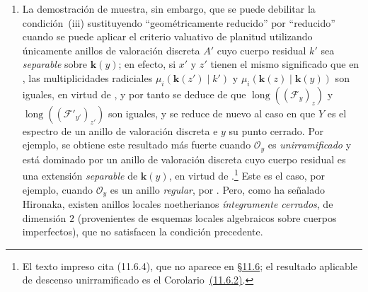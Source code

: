 \begin{remarks}[15.2.4]
\begin{enumerate}[label=(\roman*)]
Para construir los anillos $A$ y $A'$, partamos de un cuerpo imperfecto $k$ de característica $p>0$; sea $K_0=k((T))$ el cuerpo de las series formales sobre $k$, $A_0$ el anillo de valoración para $K_0$ correspondiente a la valoración discreta igual al \emph{orden} de las series formales; el cuerpo residual de $A_0$ es, pues, $k$.
Sea $\alpha$ un elemento de $k$ que no es una potencia $p$-ésima, y tomemos $k'=k(\alpha^{1/p})$; $K=k'((T))$ es entonces una extensión radicial finita de $K_0$, y $A'=A_0\otimes_k k'$ es el anillo de valoración discreta para $K$ correspondiente al orden de las series formales sobre $K$.
Si $\mathfrak m'$ es el ideal maximal de $A'$, las condiciones 1) y 2) se satisfacen tomando $A=A_0+\mathfrak m'$: en efecto, como $A_0$ es noetheriano y $A'$ es un $A_0$-módulo de tipo finito, $A$ es una $A_0$-álgebra finita, y por tanto un anillo noetheriano; como $A'$ es finito sobre $A$, $\mathfrak m'$ es el único ideal maximal de $A$, que es así un anillo local completo, evidentemente de dimensión $1$ (por ser finito sobre $A_0$) y geométricamente unirramificado, puesto que $A'$ es íntegramente cerrado y tiene el mismo cuerpo de fracciones $K$ que $A$.
  \item La demostración de  muestra, sin embargo, que se puede debilitar la condición~(iii) sustituyendo ``geométricamente reducido'' por ``reducido'' cuando se puede aplicar el criterio valuativo de planitud  utilizando únicamente anillos de valoración discreta $A'$ cuyo cuerpo residual $k'$ sea \emph{separable} sobre $\boldsymbol{k}(y)$; en efecto, si $x'$ y $z'$ tienen el mismo significado que en , las multiplicidades radiciales $\mu_i(\boldsymbol{k}(z')\mid k')$ y $\mu_i(\boldsymbol{k}(z)\mid\boldsymbol{k}(y))$ son iguales, en virtud de , y por tanto se deduce de  que $\operatorname{long}((\mathcal F_y)_z)$ y $\operatorname{long}((\mathcal F'_{y'})_{z'})$ son iguales, y se reduce de nuevo al caso en que $Y$ es el espectro de un anillo de valoración discreta e $y$ su punto cerrado.
Por ejemplo, se obtiene este resultado más fuerte cuando $\mathcal O_y$ es \emph{unirramificado} y está dominado por un anillo de valoración discreta cuyo cuerpo residual es una extensión \emph{separable} de $\boldsymbol{k}(y)$, en virtud de .\footnote{El texto impreso cita (11.6.4), que no aparece en {\hyperlink{ega4.c04.subsec.11-6}{\S11.6}}; el resultado aplicable de descenso unirramificado es el Corolario~{\hyperlink{ega4.c04.cor.11-6-2}{(11.6.2)}}.}
Este es el caso, por ejemplo, cuando $\mathcal O_y$ es un anillo \emph{regular}, por .
Pero, como ha señalado Hironaka, existen anillos locales noetherianos \emph{íntegramente cerrados}, de dimensión $2$ (provenientes de esquemas locales algebraicos sobre cuerpos imperfectos), que no satisfacen la condición precedente.
\end{enumerate}
\end{remarks}

